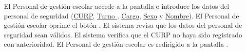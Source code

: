 \begin{UCtrayectoria}

    \UCpaso[\UCactor] El Personal de gestión escolar accede a la pantalla \label{CU33.introduceDatos} e introduce los datos del personal de seguridad (\hyperlink{Personal-de-seguridad.CURP }{CURP}, \hyperlink{personal-de-seguridad.Turno }{Turno }, \hyperlink{ Personal-de-seguridad.Cargo }{Cargo}, \hyperlink{ Personal-de-seguridad.Sexo}{Sexo} y \hyperlink{ Personal-de-seguridad.Nombre}{Nombre}).
    \UCpaso[\UCactor] El Personal de gestión escolar oprime el botón .
    \UCpaso El sistema revisa que los datos del personal de seguridad sean válidos.
    \UCpaso El sistema verifica que el CURP no haya sido registrado con anterioridad.
    \UCpaso[\UCactor] El Personal de gestión escolar es redirigido a la pantalla .

\end{UCtrayectoria}
